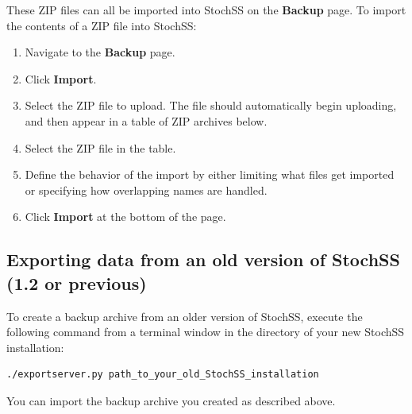 These ZIP files can all be imported into StochSS on the \textbf{Backup} page. To import the contents of a ZIP file into StochSS:

\begin{enumerate}
\item Navigate to the \textbf{Backup} page.
\item Click \textbf{Import}.
\item Select the ZIP file to upload. The file should automatically begin uploading, and then appear in a table of ZIP archives below.
\item Select the ZIP file in the table.
\item Define the behavior of the import by either limiting what files get imported or specifying how overlapping names are handled.
\item Click \textbf{Import} at the bottom of the page.
\end{enumerate}

\subsection{Exporting data from an old version of StochSS (1.2 or previous)}
To create a backup archive from an older version of StochSS, execute the following command from a terminal window in the directory of your new StochSS installation:
\begin{verbatim}
./exportserver.py path_to_your_old_StochSS_installation
\end{verbatim}
You can import the backup archive you created as described above.

